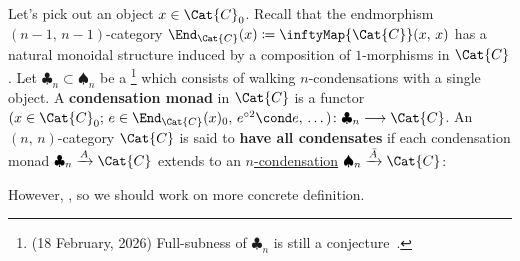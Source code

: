 \documentclass[TQFT_main]{subfiles}
\begin{document}
Let's pick out an object $x \in \Cat{C} _0$.
Recall that the endmorphism $(n-1,\, n-1)$-category $\End_{\Cat{C}} (x) \coloneqq \inftyMap{\Cat{C}} (x,\, x)$ has a natural monoidal structure induced by a composition of $1$-morphisms in $\Cat{C}$.
Let $\clubsuit_{n} \subset \spadesuit_{n}$ be a \footnote{(18 February, 2026) Full-subness of $\clubsuit_n$ is still a conjecture~\cite{gaiotto2025condensationshighercategories}.} which consists of walking $n$-condensations with a single object.
A \textbf{condensation monad} in $\Cat{C}$ is a functor $(x \in \Cat{C}_0;\, e \in \End_{\Cat{C}}(x)_0,\, e^{\circ 2} \cond e,\, \dots) \colon \clubsuit_{n} \lto \Cat{C}$.
An $(n,\, n)$-category $\Cat{C}$ is said to \textbf{have all condensates} 
if each condensation monad $\clubsuit_n \xrightarrow{A} \Cat{C}$ extends to an \hyperref[def:n-cond]{$n$-condensation} $\spadesuit_n \xrightarrow{\bar{A}} \Cat{C}$:

\begin{center}
\end{center}

However, ,
so we should work on more concrete definition.
\end{document}
